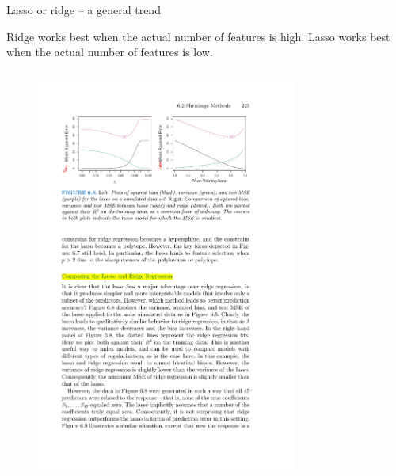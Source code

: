 \documentclass[mathserif, aspectratio=169]{beamer}
\begin{document}
\begin{frame}{Lasso or ridge -- a general trend}

Ridge works best when the actual number of features is high.  Lasso works best when the actual number of features is low. 
\vspace{5mm}
\begin{columns}
\begin{figure}
\includegraphics[scale=1]{lasso-v-ridge-45variables}
\end{figure}
\begin{figure}

\end{figure}
\end{columns}
\end{frame}
\end{document}
